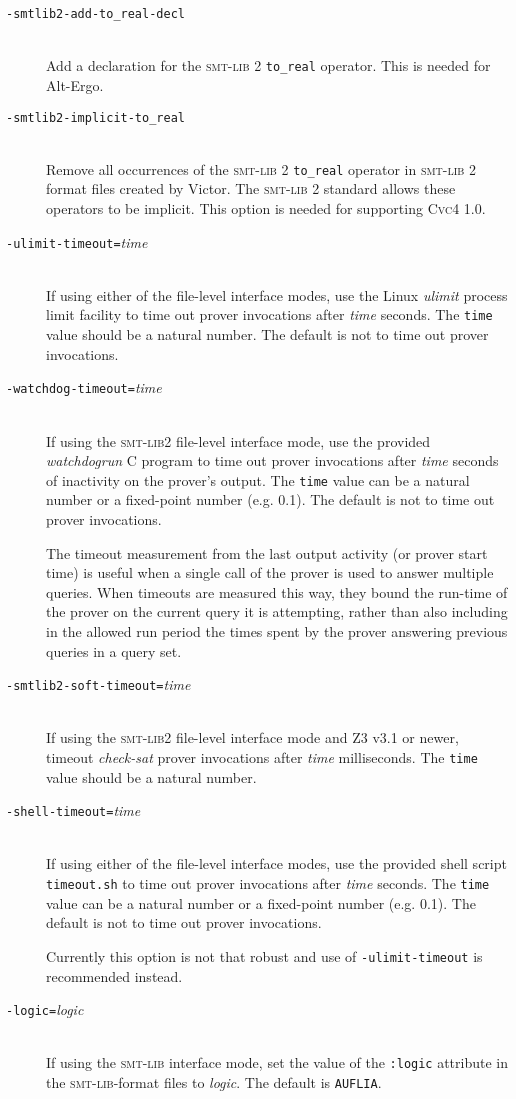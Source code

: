 \documentclass[12pt,fleqn]{article}
\newcommand{\cvcfour}{\textsc{Cvc}4}
\newcommand{\zthree}{\textsc{Z}3}
\newcommand{\altergo}{Alt-Ergo}
\newcommand{\smtlib}{\textsc{smt-lib}}
\newcommand{\optionb}[1]{\item[\texttt{-{#1}}]\ \\}
\newcommand{\optionv}[2]{\item[\texttt{-{#1}=}\mdseries\textit{#2}]\ \\}
\begin{document}
\begin{description}
\optionb{smtlib2-add-to\_real-decl}
  Add a declaration for the \smtlib{} 2 \verb+to_real+ operator.  This is needed
  for \altergo{}.

\optionb{smtlib2-implicit-to\_real}
  Remove all occurrences of the \smtlib{} 2 \verb+to_real+ operator in
  \smtlib{} 2 format files created by Victor.  The \smtlib{} 2 standard
  allows these operators to be implicit.  This option is needed for
  supporting \cvcfour{} 1.0.

\optionv{ulimit-timeout}{time}
  If using either of the file-level interface modes, 
   use the Linux 
  \emph{ulimit} process limit facility to time out
  prover invocations after \emph{time} seconds.  The \texttt{time} value 
  should be a natural number.
  The default is not to time out prover invocations.

\optionv{watchdog-timeout}{time}
  If using the \smtlib{}2 file-level interface mode, use the provided
  \emph{watchdogrun} C program to time out prover invocations after
  \emph{time} seconds of inactivity on the prover's output.  The
  \texttt{time} value can be a natural number or a fixed-point
  number (e.g. 0.1).  The default is not to time out prover invocations.

  The timeout measurement from the last output activity (or prover
  start time) is useful when a single call of the prover is used to
  answer multiple queries.  When timeouts are measured this way, they
  bound the run-time of the prover on the current query it is
  attempting, rather than also including in the allowed run period the
  times spent by the prover answering previous queries in a query set.

\optionv{smtlib2-soft-timeout}{time}
 If using the \smtlib{}2 file-level interface mode and \zthree{} v3.1 or newer,
 timeout \emph{check-sat} prover invocations after \emph{time} milliseconds.
 The \texttt{time} value should be a natural number.

\optionv{shell-timeout}{time}
  If using either of the file-level interface modes, 
   use the provided shell script 
   \texttt{timeout.sh} to time out prover invocations after \emph{time} 
  seconds.  The \texttt{time} value can
  be a natural number or a fixed-point number (e.g. 0.1).
  The default is not to time out prover invocations.

  Currently this option is not that robust and use of \texttt{-ulimit-timeout}
  is recommended instead.

\optionv{logic}{logic}
  If using the \smtlib{} interface mode, set the value of the 
  \texttt{:logic} attribute in the \smtlib{}-format files to \emph{logic}.
  The default is \texttt{AUFLIA}.


\end{description}
\end{document}
